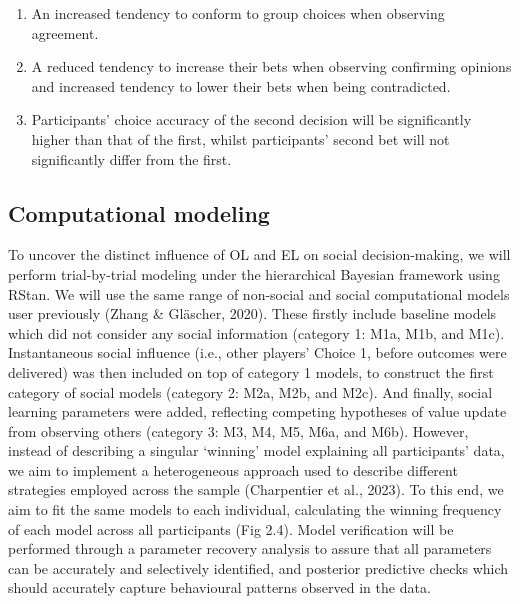 \documentclass[12pt,a4paper,oneside,]{book} %
\begin{document}
\begin{enumerate}
\def\labelenumi{\arabic{enumi}.}
\item
  An increased tendency to conform to group choices when observing agreement.
\item
  A reduced tendency to increase their bets when observing confirming opinions and increased tendency to lower their bets when being contradicted.
\item
  Participants' choice accuracy of the second decision will be significantly higher than that of the first, whilst participants' second bet will not significantly differ from the first.
\end{enumerate}

\subsection{Computational modeling}\label{computational-modeling}

To uncover the distinct influence of OL and EL on social decision-making, we will perform trial-by-trial modeling under the hierarchical Bayesian framework using RStan. We will use the same range of non-social and social computational models user previously (Zhang \& Gläscher, 2020). These firstly include baseline models which did not consider any social information (category 1: M1a, M1b, and M1c). Instantaneous social influence (i.e., other players' Choice 1, before outcomes were delivered) was then included on top of category 1 models, to construct the first category of social models (category 2: M2a, M2b, and M2c). And finally, social learning parameters were added, reflecting competing hypotheses of value update from observing others (category 3: M3, M4, M5, M6a, and M6b). However, instead of describing a singular `winning' model explaining all participants' data, we aim to implement a heterogeneous approach used to describe different strategies employed across the sample (Charpentier et al., 2023). To this end, we aim to fit the same models to each individual, calculating the winning frequency of each model across all participants (Fig 2.4). Model verification will be performed through a parameter recovery analysis to assure that all parameters can be accurately and selectively identified, and posterior predictive checks which should accurately capture behavioural patterns observed in the data.
\end{document}

